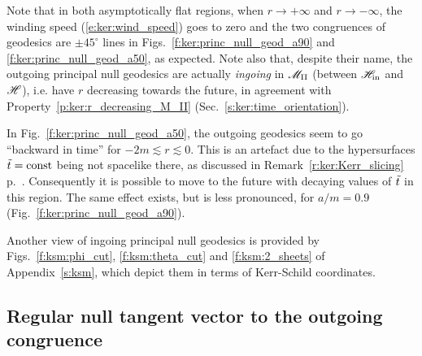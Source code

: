 Note that in both asymptotically flat regions, when $r\rightarrow +\infty$ and
$r\rightarrow -\infty$, the winding speed (\ref{e:ker:wind_speed}) goes to zero
and the two congruences of geodesics are $\pm 45^\circ$ lines
in Figs.~\ref{f:ker:princ_null_geod_a90} and
\ref{f:ker:princ_null_geod_a50}, as expected.
Note also that, despite their name, the outgoing principal null geodesics are actually
\emph{ingoing} in $\mathscr{M}_{\rm II}$ (between $\mathscr{H}_{\rm in}$ and $\mathscr{H}$), i.e. have $r$ decreasing
towards the future, in agreement with Property~\ref{p:ker:r_decreasing_M_II}
(Sec.~\ref{s:ker:time_orientation}).

\begin{remark}
In Fig.~\ref{f:ker:princ_null_geod_a50},
the outgoing geodesics seem to go ``backward in time'' for $-2m \lesssim r \lesssim 0$. This
is an artefact due to the hypersurfaces ${\tilde t} = \mathrm{const}$ being not spacelike
there, as discussed in Remark~\ref{r:ker:Kerr_slicing}
p.~\pageref{r:ker:Kerr_slicing}.
Consequently it is possible to move to the future with decaying values
of ${\tilde t}$ in this region.
The same effect exists, but is less pronounced, for $a/m=0.9$ (Fig.~\ref{f:ker:princ_null_geod_a90}).
\end{remark}

Another view of ingoing principal null geodesics is provided by Figs.~\ref{f:ksm:phi_cut},
\ref{f:ksm:theta_cut} and \ref{f:ksm:2_sheets} of Appendix~\ref{s:ksm}, which
depict them in terms of Kerr-Schild coordinates.

\subsection{Regular null tangent vector to the outgoing congruence}

